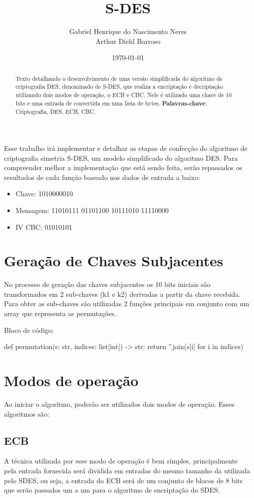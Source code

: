 \documentclass[12pt]{article}
\title{S-DES}
\author{Gabriel Henrique do Nascimento Neres \\ Arthur Diehl Barroso}
\date{\today}
\begin{document}
\maketitle

\begin{abstract}
  Texto detalhando o desenvolvimento de uma versão simplificada do algoritmo de criptografia DES, denominado de S-DES, que realiza a encriptação e decriptação utilizando dois modos de operação, o ECB e CBC. Nele é utilizado uma chave de 10 bits e uma entrada de convertida em uma lista de bytes. 
  \textbf{Palavras-chave}: Criptografia, DES, ECB, CBC.
\end{abstract}

Esse trabalho irá implementar e detalhar as etapas de confecção do algoritmo de criptografia simetria S-DES, um modelo simplificado do algoritmo DES. Para compreender melhor a implementação que está sendo feita, serão repassados os resultados de cada função baseado nos dados de entrada a baixo:

\begin{itemize}
  \item Chave: 1010000010
  \item Mensagem: 11010111 01101100 10111010 11110000
  \item IV CBC: 01010101
\end{itemize}

\section{Geração de Chaves Subjacentes}
No processo de geração das chaves subjacentes os 10 bits iniciais são transformados em 2 sub-chaves (k1 e k2) derivadas a partir da chave recebida. Para obter as sub-chaves são utilizadas 2 funções principais em conjunto com um array que representa as permutações.

Bloco de código:

def permutation(s: str, indices: list[int]) -> str:
    return ''.join(s[i] for i in indices)

\section{Modos de operação}
Ao iniciar o algoritmo, poderão ser utilizados dois modos de operação. Esses algoritmos são:

\subsection{ECB}
A técnica utilizada por esse modo de operação é bem simples, principalmente pela entrada fornecida será dividida em entradas do mesmo tamanho da utilizada pelo SDES, ou seja, a entrada do ECB será de um conjunto de blocos de 8 bits que serão passados um a um para o algoritmo de encriptação do SDES.
\end{document}
